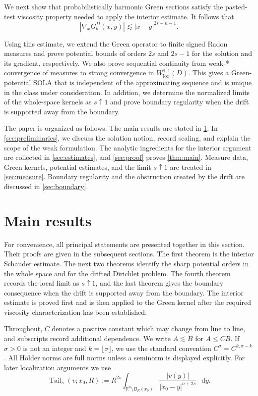 \documentclass[10pt,a4paper]{amsart}
\numberwithin{equation}{section}
\newcommand{\R}{\mathbb R}
\newcommand{\differential}{\mathop{}\!\mathrm d}
\newcommand{\Tail}{\operatorname{Tail}}
\newcommand{\rev}[1]{#1}
\begin{document}
We next show that probabilistically harmonic Green sections satisfy the
pasted-test viscosity property needed to apply the interior estimate.  It
follows that
\[
 |\nabla_xG_b^D(x,y)|\lesssim |x-y|^{2s-n-1}.
\]

Using this estimate, we extend the Green operator to finite signed Radon
measures and prove potential bounds of orders $2s$ and $2s-1$ for the solution
and its gradient, respectively.  We also prove sequential continuity from
weak-* convergence of measures to strong convergence in
$W^{1,1}_{\mathrm{loc}}(D)$.  This gives a Green-potential SOLA that is
independent of the approximating sequence and is unique in the class under
consideration.  In addition, we determine the normalized limits of the
whole-space kernels as $s\uparrow1$ and prove boundary regularity when the
drift is supported away from the boundary.

The paper is organized as follows.  The main results are stated in
\cref{sec:main-results}.  In \cref{sec:preliminaries}, we discuss the
solution notion, record scaling, and explain the scope of the weak
formulation.  The analytic ingredients for the interior argument are collected
in \cref{sec:estimates}, and \cref{sec:proof} proves
\cref{thm:main}.  Measure data, Green kernels, potential estimates, and the
limit $s\uparrow1$ are treated in \cref{sec:measure}.  Boundary regularity
and the obstruction created by the drift are discussed in
\cref{sec:boundary}.

\section{Main results}\label{sec:main-results}

For convenience, all principal statements are presented together in this
section.  Their proofs are given in the subsequent sections.  The first
theorem is the interior
Schauder estimate.  The next two theorems identify the sharp potential
orders in the whole space and for the drifted Dirichlet problem.  The fourth
theorem records the local limit as $s\uparrow1$, and the last theorem gives
the boundary consequence when the drift is supported away from the
boundary.  \rev{The interior estimate is proved first and is then applied to
the Green kernel after the required viscosity characterization has been
established.}

Throughout, $C$ denotes a positive constant which may change from line to
line, and subscripts record additional dependence.  We write $A\lesssim B$
for $A\le CB$.  If $\sigma>0$ is not an integer and
$k=\lfloor\sigma\rfloor$, we use the standard convention
$C^\sigma=C^{k,\sigma-k}$.  All H\"older norms are full norms unless a
seminorm is displayed explicitly.
For later localization arguments we use
\begin{equation}\label{eq:tail-definition}
 \Tail_s(v;x_0,R):=R^{2s}
 \int_{\R^n\setminus B_R(x_0)}
 \frac{|v(y)|}{|x_0-y|^{n+2s}}\,\differential y.
\end{equation}
\end{document}
